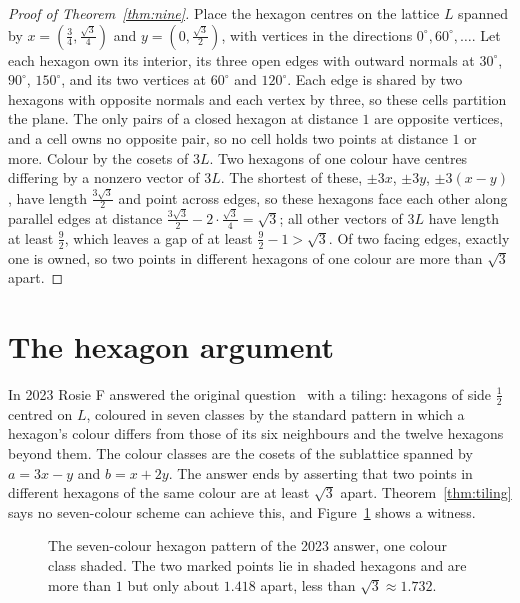 \documentclass[11pt]{amsart}
\theoremstyle{remark}
\begin{document}
\begin{proof}[Proof of Theorem~\ref{thm:nine}]
Place the hexagon centres on the lattice $L$ spanned by $x=(\frac34,\frac{\sqrt3}4)$ and $y=(0,\frac{\sqrt3}2)$, with vertices in the directions $0^\circ,60^\circ,\dots$. Let each hexagon own its interior, its three open edges with outward normals at $30^\circ$, $90^\circ$, $150^\circ$, and its two vertices at $60^\circ$ and $120^\circ$. Each edge is shared by two hexagons with opposite normals and each vertex by three, so these cells partition the plane. The only pairs of a closed hexagon at distance $1$ are opposite vertices, and a cell owns no opposite pair, so no cell holds two points at distance $1$ or more. Colour by the cosets of $3L$. Two hexagons of one colour have centres differing by a nonzero vector of $3L$. The shortest of these, $\pm3x$, $\pm3y$, $\pm3(x-y)$, have length $\frac{3\sqrt3}2$ and point across edges, so these hexagons face each other along parallel edges at distance $\frac{3\sqrt3}2-2\cdot\frac{\sqrt3}4=\sqrt3$; all other vectors of $3L$ have length at least $\frac92$, which leaves a gap of at least $\frac92-1>\sqrt3$. Of two facing edges, exactly one is owned, so two points in different hexagons of one colour are more than $\sqrt3$ apart.
\end{proof}

\section{The hexagon argument}\label{sec:hex}

In 2023 Rosie F answered the original question~\cite{Rosie} with a tiling: hexagons of side $\frac12$ centred on $L$, coloured in seven classes by the standard pattern in which a hexagon's colour differs from those of its six neighbours and the twelve hexagons beyond them. The colour classes are the cosets of the sublattice spanned by $a=3x-y$ and $b=x+2y$. The answer ends by asserting that two points in different hexagons of the same colour are at least $\sqrt3$ apart. Theorem~\ref{thm:tiling} says no seven-colour scheme can achieve this, and Figure~\ref{fig:hex} shows a witness.

\begin{figure}[ht]
\centering
\begin{tikzpicture}
  
\end{tikzpicture}
\caption{The seven-colour hexagon pattern of the 2023 answer, one colour class shaded. The two marked points lie in shaded hexagons and are more than $1$ but only about $1.418$ apart, less than $\sqrt3\approx1.732$.}
\label{fig:hex}
\end{figure}
\end{document}

